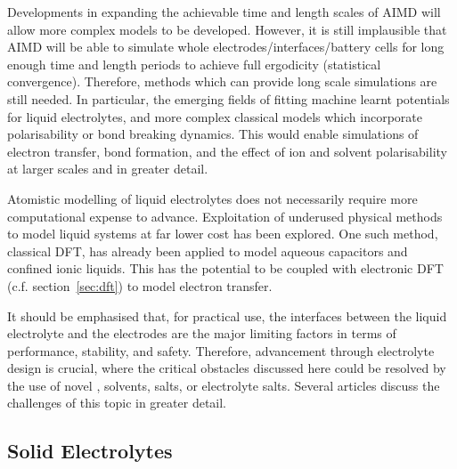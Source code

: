 \documentclass[../main.tex]{subfiles}
\begin{document}
Developments in expanding the achievable time and length scales of AIMD will allow more complex models to be developed. However, it is still implausible that AIMD will be able to simulate whole electrodes/interfaces/battery cells for long enough time and length periods to achieve full ergodicity (statistical convergence). Therefore, methods which can provide long scale simulations are still needed. In particular, the emerging fields of fitting machine learnt potentials for liquid electrolytes,\cite{shao2021modelling, hellstrom2016concentration, tovey2020dft} and more complex classical models which incorporate polarisability\cite{marin-lafleche_metalwalls_2020,schroder_polarizable_2020} or bond breaking dynamics.\cite{fedkin2019development,hossain2020lithium} This would enable simulations of electron transfer, bond formation, and the effect of ion and solvent polarisability at larger scales and in greater detail.
    
Atomistic modelling of liquid electrolytes does not necessarily require more computational expense to advance. Exploitation of underused physical methods to model liquid systems at far lower cost has been explored. One such method, classical DFT, has already been applied to model aqueous capacitors\cite{jeanmairet2019study} and confined ionic liquids.\cite{forsman_classical_2011} This has the potential to be coupled with electronic DFT (c.f. section~\ref{sec:dft}) to model electron transfer.\cite{jeanmairet2019molecular}

It should be emphasised that, for practical use, the interfaces between the liquid electrolyte and the electrodes are the major limiting factors in terms of performance, stability, and safety. Therefore, advancement through electrolyte design is crucial, where the critical obstacles discussed here could be resolved by the use of novel , solvents, salts, or electrolyte salts. Several articles discuss the challenges of this topic in greater detail.\cite{jie2020advanced,francis2020lithium,xiong2018toward}

\subsection{Solid Electrolytes}
\label{sec:solid_electrolytes}
\end{document}
